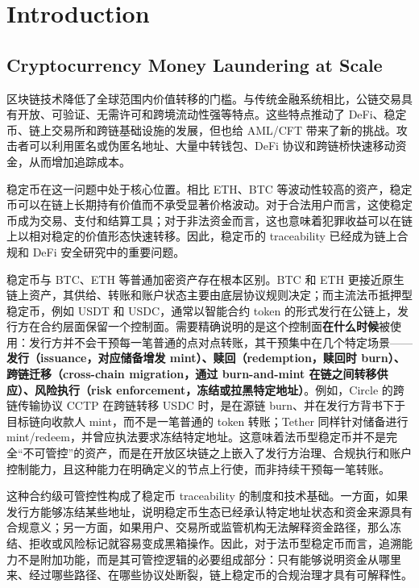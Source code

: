 \documentclass[12pt,a4paper]{ctexart}
\begin{document}
\hypertarget{introduction}{%
\section{Introduction}\label{introduction}}

\hypertarget{cryptocurrency-money-laundering-at-scale}{%
\subsection{Cryptocurrency Money Laundering at
Scale}\label{cryptocurrency-money-laundering-at-scale}}

区块链技术降低了全球范围内价值转移的门槛。与传统金融系统相比，公链交易具有开放、可验证、无需许可和跨境流动性强等特点。这些特点推动了
DeFi、稳定币、链上交易所和跨链基础设施的发展，但也给 AML/CFT
带来了新的挑战。攻击者可以利用匿名或伪匿名地址、大量中转钱包、DeFi
协议和跨链桥快速移动资金，从而增加追踪成本。

稳定币在这一问题中处于核心位置。相比 ETH、BTC
等波动性较高的资产，稳定币可以在链上长期持有价值而不承受显著价格波动。对于合法用户而言，这使稳定币成为交易、支付和结算工具；对于非法资金而言，这也意味着犯罪收益可以在链上以相对稳定的价值形态快速转移。因此，稳定币的
traceability 已经成为链上合规和 DeFi 安全研究中的重要问题。

稳定币与 BTC、ETH 等普通加密资产存在根本区别。BTC 和 ETH
更接近原生链上资产，其供给、转账和账户状态主要由底层协议规则决定；而主流法币抵押型稳定币，例如
USDT 和 USDC，通常以智能合约 token
的形式发行在公链上，发行方在合约层面保留一个控制面。需要精确说明的是这个控制面\textbf{在什么时候}被使用：发行方并不会干预每一笔普通的点对点转账，其干预集中在几个特定场景------\textbf{发行（issuance，对应储备增发
mint）、赎回（redemption，赎回时 burn）、跨链迁移（cross-chain
migration，通过 burn-and-mint 在链之间转移供应）、风险执行（risk
enforcement，冻结或拉黑特定地址）}。例如，Circle 的跨链传输协议 CCTP
在跨链转移 USDC 时，是在源链 burn、并在发行方背书下于目标链向收款人
mint，而不是一笔普通的 token 转账；Tether 同样针对储备进行
mint/redeem，并曾应执法要求冻结特定地址。这意味着法币型稳定币并不是完全``不可管控''的资产，而是在开放区块链之上嵌入了发行方治理、合规执行和账户控制能力，且这种能力在明确定义的节点上行使，而非持续干预每一笔转账。

这种合约级可管控性构成了稳定币 traceability
的制度和技术基础。一方面，如果发行方能够冻结某些地址，说明稳定币生态已经承认特定地址状态和资金来源具有合规意义；另一方面，如果用户、交易所或监管机构无法解释资金路径，那么冻结、拒收或风险标记就容易变成黑箱操作。因此，对于法币型稳定币而言，追溯能力不是附加功能，而是其可管控逻辑的必要组成部分：只有能够说明资金从哪里来、经过哪些路径、在哪些协议处断裂，链上稳定币的合规治理才具有可解释性。
\end{document}
